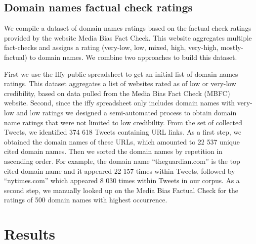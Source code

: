 \documentclass{article}
\begin{document}
\subsection{Domain names factual check ratings} 

We compile a dataset of domain names ratings based on the factual check ratings provided by the website Media Bias Fact Check. This website aggregates multiple fact-checks and assigns a rating (very-low, low, mixed, high, very-high, mostly-factual) to domain names. We combine two approaches to build this dataset. 

First we use the Iffy public spreadsheet to get an initial list of domain names ratings. This dataset aggregates a list of websites rated as of low or very-low credibility, based on data pulled from the Media Bias Fact Check (MBFC) website. 
Second, since the iffy spreadsheet only includes domain names with very-low and low ratings we designed a semi-automated process to obtain domain name ratings that were not limited to low credibility. From the set of collected Tweets, we identified 374 618 Tweets containing URL links. As a first step, we obtained the domain names of these URLs, which amounted to 22 537 unique cited domain names. Then we sorted the domain names by repetition in ascending order. For example, the domain name “theguardian.com” is the top cited domain name and it appeared 22 157 times within Tweets, followed by “nytimes.com” which appeared 8 030 times within Tweets in our corpus. As a second step, we manually looked up on the Media Bias Factual Check for the ratings of 500 domain names with highest occurrence. 

\section{Results}
\end{document}
